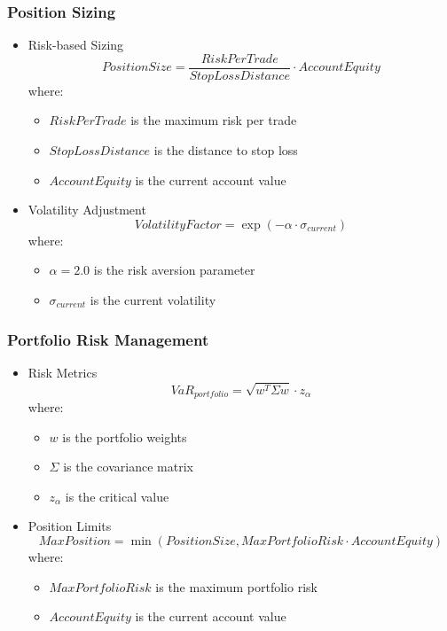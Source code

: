 \documentclass[conference]{IEEEtran}
\begin{document}
\subsubsection{Position Sizing}
\begin{itemize}
    \item Risk-based Sizing
    \begin{equation}
    PositionSize = \frac{RiskPerTrade}{StopLossDistance} \cdot AccountEquity
    \end{equation}
    where:
    \begin{itemize}
        \item $RiskPerTrade$ is the maximum risk per trade
        \item $StopLossDistance$ is the distance to stop loss
        \item $AccountEquity$ is the current account value
    \end{itemize}
    
    \item Volatility Adjustment
    \begin{equation}
    VolatilityFactor = \exp(-\alpha \cdot \sigma_{current})
    \end{equation}
    where:
    \begin{itemize}
        \item $\alpha = 2.0$ is the risk aversion parameter
        \item $\sigma_{current}$ is the current volatility
    \end{itemize}
\end{itemize}

\subsubsection{Portfolio Risk Management}
\begin{itemize}
    \item Risk Metrics
    \begin{equation}
    VaR_{portfolio} = \sqrt{w^T \Sigma w} \cdot z_\alpha
    \end{equation}
    where:
    \begin{itemize}
        \item $w$ is the portfolio weights
        \item $\Sigma$ is the covariance matrix
        \item $z_\alpha$ is the critical value
    \end{itemize}
    
    \item Position Limits
    \begin{equation}
    MaxPosition = \min(PositionSize, MaxPortfolioRisk \cdot AccountEquity)
    \end{equation}
    where:
    \begin{itemize}
        \item $MaxPortfolioRisk$ is the maximum portfolio risk
        \item $AccountEquity$ is the current account value
    \end{itemize}
\end{itemize}
\end{document}
